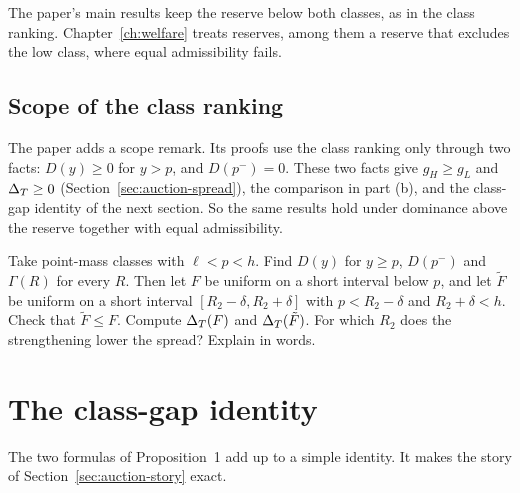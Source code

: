 The paper's main results keep the reserve below both classes, as in the class ranking. Chapter~\ref{ch:welfare}
treats reserves, among them a reserve that excludes the low class, where equal admissibility fails.

\subsection*{Scope of the class ranking}

The paper adds a scope remark. Its proofs use the class ranking only through two facts: \(D(y)\ge0\) for \(y>p\),
and \(D(p^-)=0\). These two facts give \(g_H\ge g_L\) and \(\Delta_T\ge0\) (Section~\ref{sec:auction-spread}), the
comparison in part (b), and the class-gap identity of the next section. So the same results hold under dominance
above the reserve together with equal admissibility.

\begin{checkyourself}
\label{q:auction-reserve}
Take point-mass classes with \(\ell<p<h\). Find \(D(y)\) for \(y\ge p\), \(D(p^-)\) and \(\Gamma(R)\) for every
\(R\). Then let \(F\) be uniform on a short interval below \(p\), and let \(\tilde F\) be uniform on a short
interval \([R_2-\delta,R_2+\delta]\) with \(p<R_2-\delta\) and \(R_2+\delta<h\). Check that \(\tilde F\le F\). Compute
\(\Delta_T(F)\) and \(\Delta_T(\tilde F)\). For which \(R_2\) does the strengthening lower the spread? Explain in words.
\end{checkyourself}

\section{The class-gap identity}\label{sec:auction-gap}

The two formulas of Proposition~1 add up to a simple identity. It makes the story of
Section~\ref{sec:auction-story} exact.

